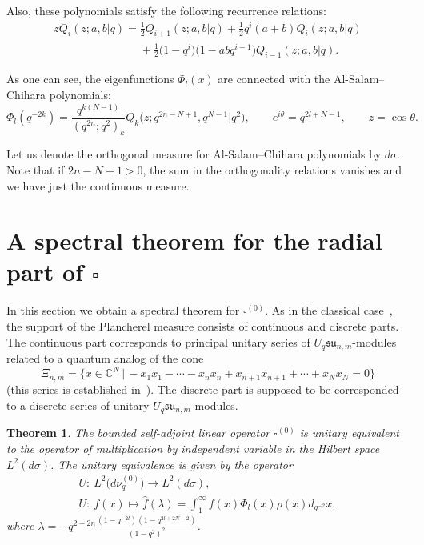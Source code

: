 \documentclass[11pt]{article}
\newtheorem{theorem}{Theorem}
\begin{document}
Also, these polynomials satisfy the following recurrence relations:
\begin{gather}
zQ_i(z;a,b|q)=\frac12
Q_{i+1}(z;a,b|q)+\frac12q^i(a+b)Q_i(z;a,b|q)\nonumber\\
\phantom{zQ_i(z;a,b|q)=}{} +\frac12\big(1-q^i\big)\big(1-abq^{i-1}\big)Q_{i-1}(z;a,b|q).\label{rec_ASC}
\end{gather}

As one can see, the eigenfunctions $\Phi_l(x)$ are connected with the Al-Salam--Chihara polynomials:
\[
\Phi_l(q^{-2k}) = \frac{q^{k(N-1)}}{(q^{2n};q^2)_k}Q_k\big(z;q^{2n-N+1},q^{N-1}|q^2\big), \qquad
e^{i\theta}=q^{2l+N-1},\qquad z=\cos\theta.
\]

Let us denote the orthogonal measure for Al-Salam--Chihara polynomials by $d\sigma$.  Note that if $2n-N+1>0$,
the sum in the orthogonality relations vanishes and we have just the continuous measure.



\section[A spectral theorem for the radial part of $\square$]{A spectral theorem for the radial part of $\boldsymbol{\square}$}\label{sec_9}

In this section we obtain a spectral theorem for $\square^{(0)}$. As in the classical case~\cite[pp.~429--432]{Faraut}, the support of the Plancherel measure consists of continuous and discrete parts.
The continuous part corresponds to principal unitary series of $U_q \mathfrak{su}_{n,m}$-modules related to a
quantum analog of the cone
\[
\Xi_{n,m}=\big\{x \in \mathbb C^{N}\,|\, {-}x_1 \bar{x}_1-\cdots -x_n \bar{x}_n + x_{n+1}\bar{x}_{n+1}+\cdots
+x_N\bar{x}_N=0\big\}
\]
(this series is established in~\cite{BS}). The discrete part is supposed to be corresponded to a discrete
series of unitary $U_q \mathfrak{su}_{n,m}$-modules.

\begin{theorem}
The bounded self-adjoint linear operator $\square^{(0)}$ is unitary equivalent to the operator of
multiplication by independent variable in the Hilbert space $L^2(d\sigma)$. The unitary equivalence is given
by the operator
\begin{gather*}
U:\  L^2\big(d\nu_q^{(0)}\big)  \rightarrow L^2(d\sigma),
\\
U:\ f(x) \mapsto\hat{f}(\lambda)=\int_1^\infty f(x)\Phi_l(x)\rho(x)d_{q^{-2}}x,
\end{gather*}
where $\lambda=-q^{2-2n}\frac{(1-q^{-2l})(1-q^{2l+2N-2})}{(1-q^2)^2}$.
\end{theorem}
\end{document}
